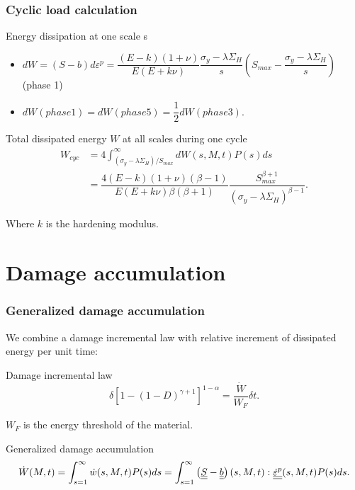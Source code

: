 \documentclass[xcolor=table]{Bredelebeamer}
\begin{document}
\begin{frame}
	\frametitle{Cyclic load calculation}	
	\begin{block}{Energy dissipation at one scale s}
		\begin{itemize}
			\item $dW=(S-b)d\varepsilon^p=\dfrac{(E-k)(1+\nu) }{E(E+k\nu)}\dfrac{\sigma_y-\lambda \Sigma_H}{s}\left(S_{max}-\dfrac{\sigma_y-\lambda \Sigma_H}{s}\right)
			$ (phase 1)
			
			\vspace{6pt}
			\item $dW(phase 1)=dW(phase 5)=\dfrac{1}{2}dW(phase 3).$
	    \end{itemize}	
	\end{block}
	\begin{block}{Total dissipated energy $W$  at all scales during one cycle}
		\begin{equation}
		\begin{split}
		W_{cyc}&=4\int_{\left( \sigma_y-\lambda \Sigma_H\right) /S_{max}}^{\infty}dW(s,M,t)P(s)ds
		\\&=\dfrac{4(E-k)(1+\nu)\left( \beta-1\right) }{ E(E+k\nu)\beta\left( \beta+1\right) }\dfrac{S_{max}^{\beta+1}}{\left( \sigma_y-\lambda \Sigma_H\right) ^{\beta-1}}.
		\end{split}
		\end{equation}
	\end{block}
	
	Where $k$ is the hardening modulus.
\end{frame}	


\section{Damage accumulation}
\begin{frame}
	\frametitle{Generalized damage accumulation}	
	We combine a damage incremental law with relative increment of dissipated energy per unit time:
	\begin{block}{Damage incremental law}	
\begin{equation}
	\delta [1-(1-D)^{\gamma+1}]^{1-\alpha}=\dfrac{\dot{W}}{W_F}\delta t.
	\label{dt}
\end{equation}
	\end{block}
	$W_F$ is the energy threshold of the material.	
		\begin{block}{ Generalized damage accumulation}	
\begin{equation}\dot{W}(M,t)=\int_{s=1}^{\infty}\dot{w}(s,M,t)P(s)ds=\int_{s=1}^{\infty}\left(\uline{\uline{S}}-\uline{\uline{b}} \right) (s,M,t):\uline{\uline{\dot{\varepsilon}^p}}(s,M,t)P(s)ds.
\end{equation}
		\end{block}
\end{frame}	
\end{document}
